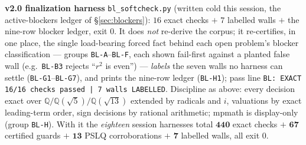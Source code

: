 \documentclass[11pt]{article}
\newcommand{\hx}[1]{\textcolor{cC}{\footnotesize\texttt{#1}}}
\newcommand{\Q}{\mathbb{Q}}
\theoremstyle{plain}
\theoremstyle{definition}
\theoremstyle{remark}
\begin{document}
\smallskip\noindent
\textbf{v2.0 finalization harness} \texttt{bl\_softcheck.py} (written cold this
session, the active-blockers ledger of \S\ref{sec:blockers}): $16$ exact checks
$+$ $7$ labelled walls $+$ the nine-row blocker ledger, exit 0. It does
\emph{not} re-derive the corpus; it re-certifies, in one place, the single
load-bearing forced fact behind each open problem's blocker classification ---
groups \hx{BL-A}--\hx{BL-F}, each shown fail-first against a planted false wall
(e.g.\ \hx{BL-B3} rejects ``$r^2$ is even'') --- \emph{labels} the seven walls no
harness can settle (\hx{BL-G1}--\hx{BL-G7}), and prints the nine-row ledger
(\hx{BL-H1}); pass line \texttt{BL: EXACT 16/16 checks passed | 7 walls
LABELLED}. Discipline as above: every decision exact over
$\Q/\Q(\sqrt5)/\Q(\sqrt{13})$ extended by radicals and $i$, valuations by exact
leading-term order, sign decisions by rational arithmetic; mpmath is display-only
(group \hx{BL-H}). With it the \emph{eighteen} session harnesses total
$\mathbf{440}$ exact checks $+$ $\mathbf{67}$ certified guards $+$ $\mathbf{13}$
PSLQ corroborations $+$ $\mathbf{7}$ labelled walls, all exit 0.
\end{document}
